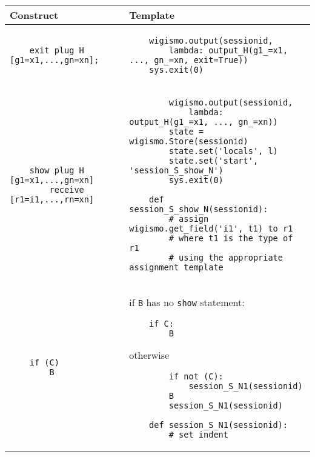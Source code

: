 \documentclass{WigReport}
\begin{document}
\begin{tabular}{| p{20em} | p{30em} |}
    \hline
    Construct & Template \\ \hline
    \begin{verbatim} 
    exit plug H [g1=x1,...,gn=xn];
    \end{verbatim}
    & 
    \begin{verbatim}
    wigismo.output(sessionid, 
        lambda: output_H(g1_=x1, ..., gn_=xn, exit=True))
    sys.exit(0)
    \end{verbatim}
    \\ \hline       
    \begin{verbatim} 
    show plug H [g1=x1,...,gn=xn]
        receive [r1=i1,...,rn=xn]
    \end{verbatim}
    & 
    \begin{verbatim}
        wigismo.output(sessionid,
            lambda: output_H(g1_=x1, ..., gn_=xn))
        state = wigismo.Store(sessionid)
        state.set('locals', l)
        state.set('start', 'session_S_show_N')
        sys.exit(0)

    def session_S_show_N(sessionid):
        # assign wigismo.get_field('i1', t1) to r1
        # where t1 is the type of r1
        # using the appropriate assignment template
    \end{verbatim}
    \\ \hline       
    \begin{verbatim} 
    if (C)
        B
    \end{verbatim}
    & 
    if {\tt B} has no {\tt show} statement:
    \begin{verbatim}
    if C:
        B
    \end{verbatim}
    otherwise
    \begin{verbatim}
        if not (C):
            session_S_N1(sessionid)
        B
        session_S_N1(sessionid)

    def session_S_N1(sessionid):
        # set indent
    \end{verbatim}
    \\ \hline       
    \end{tabular}
\end{document}
